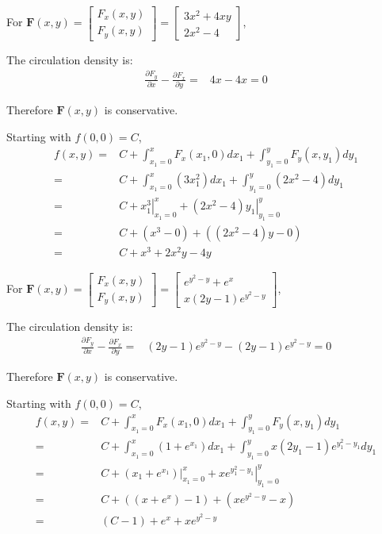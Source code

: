 \documentclass{article}
\newcommand{\colxyvec}[2]{\begin{bmatrix} #1 \\ #2 \end{bmatrix}}
\newcommand{\at}[1]{\left. #1 \right|}
\newcommand{\dr}[1]{\textcolor{dark_red}{#1}}
\begin{document}
\begin{framed}
\dr{For \(\mathbf{F}(x,y) = \colxyvec{F_x(x,y)}{F_y(x,y)} = \colxyvec{3x^2 + 4xy}{2x^2 - 4}\),}

\dr{The circulation density is: 
\begin{align*}
\frac{\partial F_y}{\partial x} - \frac{\partial F_x}{\partial y} = & 4x - 4x = 0
\end{align*}}

\dr{Therefore \(\mathbf{F}(x,y)\) is conservative.}

\dr{Starting with \(f(0,0) = C\),
\begin{align*}
f(x,y) = & C + \int_{x_1 = 0}^x F_x(x_1,0)dx_1 + \int_{y_1 = 0}^y F_y(x,y_1)dy_1 \\
= & C + \int_{x_1 = 0}^x (3x_1^2)dx_1 + \int_{y_1 = 0}^y (2x^2 - 4)dy_1 \\
= & C + \at{x_1^3}_{x_1 = 0}^x + \at{(2x^2 - 4)y_1}_{y_1 = 0}^y \\
= & C + (x^3 - 0) + ((2x^2 - 4)y - 0) \\
= & C + x^3 + 2x^2y - 4y
\end{align*}}

\end{framed}

\pagebreak

\begin{framed}
\dr{For \(\mathbf{F}(x,y) = \colxyvec{F_x(x,y)}{F_y(x,y)} = \colxyvec{e^{y^2 - y} + e^x}{x(2y - 1)e^{y^2 - y}}\),}

\dr{The circulation density is: 
\begin{align*}
\frac{\partial F_y}{\partial x} - \frac{\partial F_x}{\partial y} = & (2y - 1)e^{y^2 - y} - (2y - 1)e^{y^2 - y} = 0
\end{align*}}

\dr{Therefore \(\mathbf{F}(x,y)\) is conservative.}

\dr{Starting with \(f(0,0) = C\),
\begin{align*}
f(x,y) = & C + \int_{x_1 = 0}^x F_x(x_1,0)dx_1 + \int_{y_1 = 0}^y F_y(x,y_1)dy_1 \\
= & C + \int_{x_1 = 0}^x (1 + e^{x_1})dx_1 + \int_{y_1 = 0}^y x(2y_1 - 1)e^{y_1^2 - y_1}dy_1 \\
= & C + \at{(x_1 + e^{x_1})}_{x_1 = 0}^x + \at{xe^{y_1^2 - y_1}}_{y_1 = 0}^y \\
= & C + ((x + e^x) - 1) + (xe^{y^2 - y} - x) \\
= & (C - 1) + e^x + xe^{y^2 - y}
\end{align*}}

\end{framed}
\end{document}
